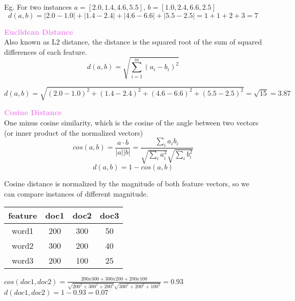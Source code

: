 \documentclass[a4paper,10pt]{article}
\begin{document}
\noindent Eg. For two instances $a = [2.0, 1.4, 4.6, 5.5]$, $b = [1.0, 2.4, 6.6, 2.5]$
\begin{equation*}
	d(a,b) = |2.0 - 1.0| + |1.4 - 2.4| + |4.6 - 6.6| + |5.5 - 2.5| = 1 + 1 + 2 + 3 = 7
\end{equation*}
\begin{shaded}
	\noindent \textcolor{Violet}{\textbf{Euclidean Distance}}\\
	Also known as L2 distance, the distance is the squared root of the sum of squared differences of each feature. 
	\begin{equation*}
		d(a,b) = \sqrt{\sum_{i=1}^{m}(a_{i} - b_{i})^2}
	\end{equation*}
\end{shaded}
\begin{equation*}
	d(a,b) = \sqrt{(2.0 - 1.0)^2 + (1.4 - 2.4)^2 + (4.6 - 6.6)^2 + (5.5 - 2.5)^2} = \sqrt{15} = 3.87
\end{equation*}
\begin{shaded}
	\noindent \textcolor{Violet}{\textbf{Cosine Distance}}\\
	One minus cosine similarity, which is the cosine of the angle between two vectors (or inner product of the normalized vectors)
	\begin{equation*}
		cos(a,b) = \frac{a \cdot b}{|a||b|} = \frac{\sum_{i}a_{i}b_{i}}{\sqrt{\sum_{i}a_{i}^{2}}\sqrt{\sum_{i}b_{i}^{2}}}
	\end{equation*}
	\begin{equation*}
		d(a,b) = 1 - cos(a,b)
	\end{equation*}
\end{shaded}
\noindent Cosine distance is normalized by the magnitude of both feature vectors, so we can compare instances of different magnitude. \\
\begin{center}
	\begin{tabular}{ |c|c|c|c| }
		\hline 
		feature &doc1 &doc2 &doc3 \\
		\hline 
		word1 &200 &300 &50 \\
		word2 &300 &200 &40 \\
		word3 &200 &100 &25 \\
		\hline
	\end{tabular}
\end{center}
$cos(doc1, doc2) = \frac{200x300 + 300x200 + 200x100}{\sqrt{200^2 + 300^2 + 200^2}\sqrt{300^2+200^2+100^2}} = 0.93$ \\
$d(doc1, doc2) = 1 - 0.93 = 0.07$ \\\\
\end{document}
